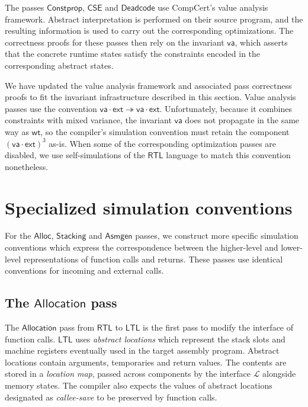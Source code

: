 \documentclass[11pt,oneside,draft]{book}
\theoremstyle{definition}
\newcommand{\kw}[1]{\ensuremath{ \mathsf{#1} }}
\begin{document}
The passes
$\kw{Constprop}$, $\kw{CSE}$ and $\kw{Deadcode}$
use CompCert's value analysis framework.
Abstract interpretation is performed %
on their source program,
and the resulting information is used to carry out
the corresponding optimizations.
The correctness proofs for these passes then rely
on the invariant $\kw{va}$,
which asserts that the concrete runtime states
satisfy the constraints encoded in the corresponding
abstract states.

We have updated the value analysis framework
and associated pass correctness proofs
to fit the invariant infrastructure described in this section.
Value analysis passes use the convention
$\kw{va} \cdot \kw{ext} \twoheadrightarrow \kw{va} \cdot \kw{ext}$.
Unfortunately,
because it combines constraints with mixed variance,
the invariant $\kw{va}$ does not propagate in the same way as $\kw{wt}$,
so the compiler's simulation convention must retain
the component $(\kw{va} \cdot \kw{ext})^3$ as-is.
When some of the corresponding optimization passes are disabled,
we use self-simulations of the $\kw{RTL}$ language
to match this convention nonetheless.



\section{Specialized simulation conventions} \label{sec:backend} %

For the \kw{Alloc}, \kw{Stacking} and \kw{Asmgen} passes,
we construct more specific simulation conventions
which express the correspondence between
the higher-level and lower-level representations
of function calls and returns.
These passes use identical conventions for
incoming and external calls.

\subsection{The \kw{Allocation} pass} \label{sec:alloc} %

The \kw{Allocation} pass from \kw{RTL} to \kw{LTL}
is the first pass to modify the interface of function calls.
\kw{LTL} uses \emph{abstract locations}
which represent the stack slots and machine registers
eventually used in the target assembly program.
Abstract locations contain arguments, temporaries and return values.
The contents are stored in a \emph{location map},
passed across components by the interface $\mathcal{L}$
alongside memory states.
The compiler also expects the values of
abstract locations designated as \emph{callee-save}
to be preserved by function calls.
\end{document}
